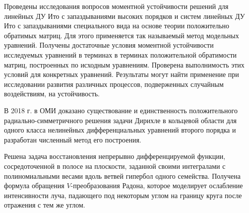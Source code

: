 Проведены исследования вопросов моментной устойчивости решений для линейных ДУ Ито с
запаздываниями высоких порядков и систем линейных ДУ Ито с запаздываниями специального вида на
основе теории положительно обратимых матриц. Для этого применяется так называемый метод модельных уравнений.
Получены достаточные условия моментной устойчивости исследуемых уравнений в терминах в терминах положительной обратимости матриц, построенных по исходным уравнениям.
Проверена выполнимость этих условий для конкретных уравнений.
Результаты могут найти применение при исследовании развития различных процессов, подверженных случайным воздействиям, на  устойчивость.









В 2018 г. в ОМИ доказано существование и единственность положительного радиально-симметричного решения задачи Дирихле в кольцевой области для одного класса нелинейных дифференциальных уравнений второго порядка и разработан численный метод его построения.




Решена задача восстановления непрерывно дифференцируемой функции, сосредоточенной в полосе на плоскости, заданной своими интегралами с полиномиальными весами вдоль ветвей гипербол одного семейства.
Получена формула обращения $V$-преобразования Радона, которое моделирует ослабление интенсивности луча, падающего под некоторым углом на границу круга после отражения с тем же углом.









